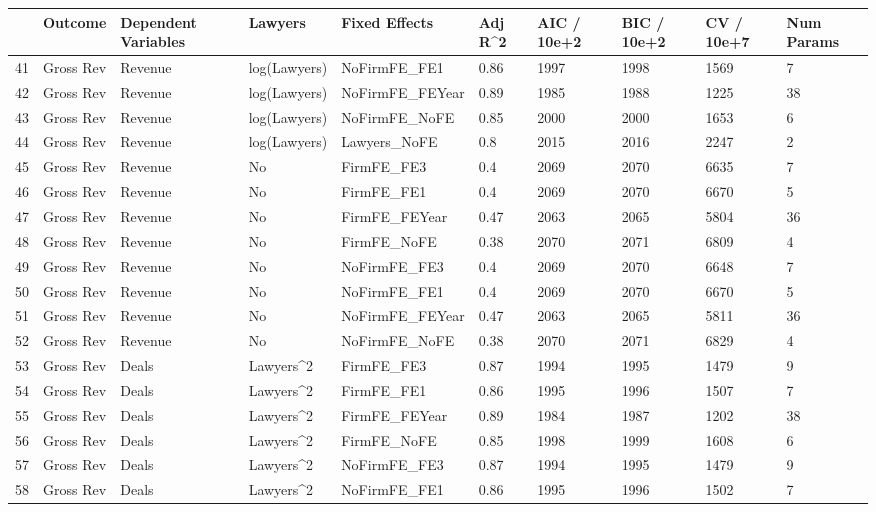 \documentclass{article}
\begin{document}
\begin{table}[H]
\centering
\begin{tabular}{rlllllllll}
  \hline
 & Outcome & Dependent Variables & Lawyers & Fixed Effects & Adj R^2 & AIC / 10e+2 & BIC / 10e+2 & CV / 10e+7 & Num Params \\ 
  \hline
41 & Gross Rev & Revenue & log(Lawyers) & NoFirmFE\_FE1 & 0.86 & 1997 & 1998 & 1569 & 7 \\ 
  42 & Gross Rev & Revenue & log(Lawyers) & NoFirmFE\_FEYear & 0.89 & 1985 & 1988 & 1225 & 38 \\ 
  43 & Gross Rev & Revenue & log(Lawyers) & NoFirmFE\_NoFE & 0.85 & 2000 & 2000 & 1653 & 6 \\ 
  44 & Gross Rev & Revenue & log(Lawyers) & Lawyers\_NoFE & 0.8 & 2015 & 2016 & 2247 & 2 \\ 
  45 & Gross Rev & Revenue & No & FirmFE\_FE3 & 0.4 & 2069 & 2070 & 6635 & 7 \\ 
  46 & Gross Rev & Revenue & No & FirmFE\_FE1 & 0.4 & 2069 & 2070 & 6670 & 5 \\ 
  47 & Gross Rev & Revenue & No & FirmFE\_FEYear & 0.47 & 2063 & 2065 & 5804 & 36 \\ 
  48 & Gross Rev & Revenue & No & FirmFE\_NoFE & 0.38 & 2070 & 2071 & 6809 & 4 \\ 
  49 & Gross Rev & Revenue & No & NoFirmFE\_FE3 & 0.4 & 2069 & 2070 & 6648 & 7 \\ 
  50 & Gross Rev & Revenue & No & NoFirmFE\_FE1 & 0.4 & 2069 & 2070 & 6670 & 5 \\ 
  51 & Gross Rev & Revenue & No & NoFirmFE\_FEYear & 0.47 & 2063 & 2065 & 5811 & 36 \\ 
  52 & Gross Rev & Revenue & No & NoFirmFE\_NoFE & 0.38 & 2070 & 2071 & 6829 & 4 \\ 
  53 & Gross Rev & Deals & Lawyers^2 & FirmFE\_FE3 & 0.87 & 1994 & 1995 & 1479 & 9 \\ 
  54 & Gross Rev & Deals & Lawyers^2 & FirmFE\_FE1 & 0.86 & 1995 & 1996 & 1507 & 7 \\ 
  55 & Gross Rev & Deals & Lawyers^2 & FirmFE\_FEYear & 0.89 & 1984 & 1987 & 1202 & 38 \\ 
  56 & Gross Rev & Deals & Lawyers^2 & FirmFE\_NoFE & 0.85 & 1998 & 1999 & 1608 & 6 \\ 
  57 & Gross Rev & Deals & Lawyers^2 & NoFirmFE\_FE3 & 0.87 & 1994 & 1995 & 1479 & 9 \\ 
  58 & Gross Rev & Deals & Lawyers^2 & NoFirmFE\_FE1 & 0.86 & 1995 & 1996 & 1502 & 7 \\ 

\end{tabular}
\end{table}
\end{document}
